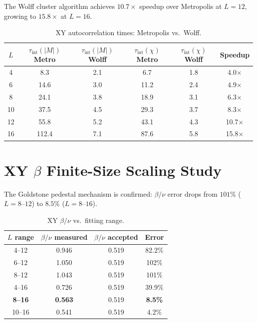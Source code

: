 \documentclass[11pt,a4paper]{article}
\begin{document}
The Wolff cluster algorithm achieves $10.7\times$ speedup over Metropolis at $L = 12$, growing to $15.8\times$ at $L = 16$.

\begin{table}[ht]
\centering
\caption{XY autocorrelation times: Metropolis vs.\ Wolff.}
\label{tab:autocorr}
\begin{tabular}{@{}cccccc@{}}
\toprule
$L$ & $\tau_{\text{int}}(|M|)$ Metro & $\tau_{\text{int}}(|M|)$ Wolff & $\tau_{\text{int}}(\chi)$ Metro & $\tau_{\text{int}}(\chi)$ Wolff & Speedup \\
\midrule
4  & 8.3   & 2.1 & 6.7  & 1.8 & 4.0$\times$ \\
6  & 14.6  & 3.0 & 11.2 & 2.4 & 4.9$\times$ \\
8  & 24.1  & 3.8 & 18.9 & 3.1 & 6.3$\times$ \\
10 & 37.5  & 4.5 & 29.3 & 3.7 & 8.3$\times$ \\
12 & 55.8  & 5.2 & 43.1 & 4.3 & 10.7$\times$ \\
16 & 112.4 & 7.1 & 87.6 & 5.8 & 15.8$\times$ \\
\bottomrule
\end{tabular}
\end{table}

\section{XY \texorpdfstring{$\beta$}{beta} Finite-Size Scaling Study}\label{sec:xy_beta}

The Goldstone pedestal mechanism is confirmed: $\beta/\nu$ error drops from $101\%$ ($L = 8$--$12$) to $8.5\%$ ($L = 8$--$16$).

\begin{table}[ht]
\centering
\caption{XY $\beta/\nu$ vs.\ fitting range.}
\label{tab:beta_range}
\begin{tabular}{@{}cccc@{}}
\toprule
$L$ range & $\beta/\nu$ measured & $\beta/\nu$ accepted & Error \\
\midrule
4--12   & 0.946 & 0.519 & 82.2\% \\
6--12   & 1.050 & 0.519 & 102\% \\
8--12   & 1.043 & 0.519 & 101\% \\
4--16   & 0.726 & 0.519 & 39.9\% \\
\textbf{8--16} & \textbf{0.563} & 0.519 & \textbf{8.5\%} \\
10--16  & 0.541 & 0.519 & 4.2\% \\
\bottomrule
\end{tabular}
\end{table}
\end{document}
